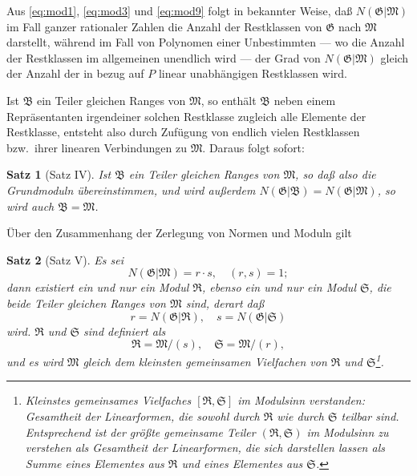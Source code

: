 \documentclass[fontsize=10pt,paper=a5,pagesize,headings=small]{scrbook}
\theoremstyle{plain}
\newtheorem*{satz}{Satz}
\begin{document}
Aus \eqref{eq:mod1}, \eqref{eq:mod3} und \eqref{eq:mod9} folgt in bekannter Weise, daß
$N(\mathfrak{G}|\mathfrak{M})$ im Fall ganzer rationaler Zahlen die Anzahl der Restklassen von $\mathfrak{G}$ nach $\mathfrak{M}$
darstellt, während im Fall von Polynomen einer Unbestimmten --- wo die Anzahl der
Restklassen im allgemeinen unendlich wird --- der Grad von $N(\mathfrak{G}|\mathfrak{M})$ gleich der Anzahl
der in bezug auf $P$ linear unabhängigen Restklassen wird.

Ist $\mathfrak{B}$ ein Teiler gleichen Ranges von $\mathfrak{M}$, so enthält $\mathfrak{B}$ neben einem Repräsentanten
irgendeiner solchen Restklasse zugleich alle Elemente der Restklasse, entsteht also durch
Zufügung von endlich vielen Restklassen bzw.~ihrer linearen Verbindungen zu $\mathfrak{M}$.
Daraus folgt sofort:

\begin{satz}[Satz IV]
Ist $\mathfrak{B}$ ein Teiler gleichen Ranges von $\mathfrak{M}$, so daß also die Grundmoduln übereinstimmen,
und wird außerdem $N(\mathfrak{G}|\mathfrak{B}) = N(\mathfrak{G}|\mathfrak{M})$, so wird auch $\mathfrak{B} = \mathfrak{M}$.
\end{satz}

Über den Zusammenhang der Zerlegung von Normen und Moduln gilt

\begin{satz}[Satz V]
Es sei
\begin{equation}
\label{eq:mod10}
N(\mathfrak{G}|\mathfrak{M}) = r \cdot s,\quad (r,s) = 1;
\end{equation}
dann existiert ein und nur ein Modul $\mathfrak{R}$, ebenso ein und nur ein Modul $\mathfrak{S}$, die beide Teiler
gleichen Ranges von $\mathfrak{M}$ sind, derart daß
\[ r = N(\mathfrak{G}|\mathfrak{R}),\quad s = N(\mathfrak{G}|\mathfrak{S}) \]
wird. $\mathfrak{R}$ und $\mathfrak{S}$ sind definiert als
\[ \mathfrak{R} = \mathfrak{M}/(s),\quad \mathfrak{S} = \mathfrak{M}/(r), \]
und es wird $\mathfrak{M}$ gleich dem kleinsten gemeinsamen Vielfachen von $\mathfrak{R}$ und $\mathfrak{S}$\footnote{Kleinstes
gemeinsames Vielfaches $[\mathfrak{R},\mathfrak{S}]$ im Modulsinn verstanden: Gesamtheit der Linearformen, die sowohl
durch $\mathfrak{R}$ wie durch $\mathfrak{S}$ teilbar sind. Entsprechend ist der größte gemeinsame Teiler
$(\mathfrak{R},\mathfrak{S})$ im Modulsinn zu verstehen als Gesamtheit der Linearformen, die sich darstellen
lassen als Summe eines Elementes aus $\mathfrak{R}$ und eines Elementes aus $\mathfrak{S}$.}.
\end{satz}
\end{document}
